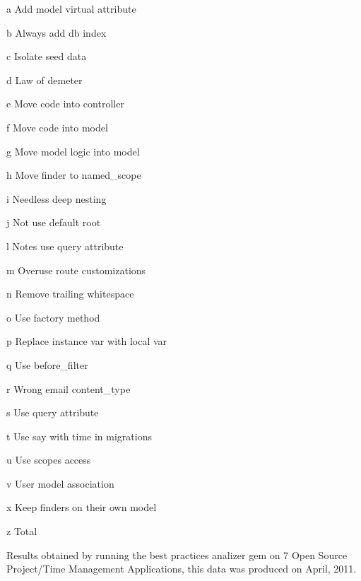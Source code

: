 \documentclass[sle]{llncs}
\begin{document}
\begin{table}[H]
\begin{center}
{\begin{threeparttable}
\begin{tablenotes}
     \item[a] Add model virtual attribute           
     \item[b] Always add db index                   
     \item[c] Isolate seed data                     
     \item[d] Law of demeter                        
     \item[e] Move code into controller             
     \item[f] Move code into model                  
     \item[g] Move model logic into model           
     \item[h] Move finder to named\_scope           
     \item[i] Needless deep nesting                 
     \item[j] Not use default root                  
     \item[l] Notes  use query attribute            
     \item[m] Overuse route customizations          
     \item[n] Remove trailing whitespace            
     \item[o] Use factory method                    
     \item[p] Replace instance var with local var   
     \item[q] Use before\_filter                    
     \item[r] Wrong email content\_type             
     \item[s] Use query attribute                   
     \item[t] Use say with time in migrations       
     \item[u] Use scopes access                     
     \item[v] User model association                
     \item[x] Keep finders on their own model       
     \item[z] Total                                 

\end{tablenotes}

\end{threeparttable}
}
\end{center}
\caption{Results obtained by running the best practices analizer gem on 7 Open Source Project/Time Management Applications, this data was produced on April, 2011.}
\label{table:OSPHWebSites}
\end{table}
\end{document}
